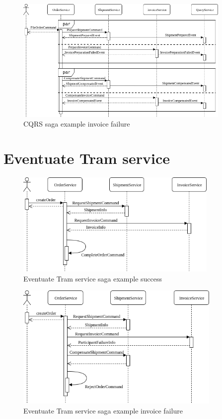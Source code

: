 \documentclass[oneside,
  digital, %
  table,   %
  lof,     %
  lot,     %
]{fithesis3}
\begin{document}
\hfill \break

\begin{figure}[h]
    \begin{center}
        \includegraphics[height=60mm]{images/sequence/invoiceFailSagaCQRS.png}
    \end{center}
    \caption{CQRS saga example invoice failure}
\end{figure}

\section{Eventuate Tram service}

\begin{figure}[h]
    \begin{center}
        \includegraphics[height=50mm]{images/sequence/validSagaTram.png}
    \end{center}
    \caption{Eventuate Tram service saga example success}
\end{figure}

\hfill \break

\begin{figure}[h]
    \begin{center}
        \includegraphics[height=60mm]{images/sequence/invoiceFailSagaTram.png}
    \end{center}
    \caption{Eventuate Tram service saga example invoice failure}
\end{figure}
\end{document}
